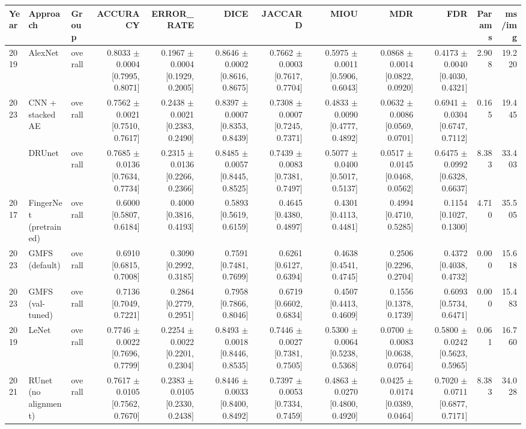 \begin{table}[t]
\centering
\small
\begin{tabular}{lllrrrrrrrrr}
\toprule
Year & Approach & Group & ACCURACY & ERROR_RATE & DICE & JACCARD & MIOU & MDR & FDR & Params & ms/img \\
\midrule
2019 & AlexNet & overall & 0.8033 $\pm$ 0.0004 [0.7995, 0.8071] & 0.1967 $\pm$ 0.0004 [0.1929, 0.2005] & 0.8646 $\pm$ 0.0002 [0.8616, 0.8675] & 0.7662 $\pm$ 0.0003 [0.7617, 0.7704] & 0.5975 $\pm$ 0.0011 [0.5906, 0.6043] & 0.0868 $\pm$ 0.0014 [0.0822, 0.0920] & 0.4173 $\pm$ 0.0040 [0.4030, 0.4321] & 2.908 & 19.220 \\
2023 & CNN + stacked AE & overall & 0.7562 $\pm$ 0.0021 [0.7510, 0.7617] & 0.2438 $\pm$ 0.0021 [0.2383, 0.2490] & 0.8397 $\pm$ 0.0007 [0.8353, 0.8439] & 0.7308 $\pm$ 0.0007 [0.7245, 0.7371] & 0.4833 $\pm$ 0.0090 [0.4777, 0.4892] & 0.0632 $\pm$ 0.0086 [0.0569, 0.0701] & 0.6941 $\pm$ 0.0304 [0.6747, 0.7112] & 0.165 & 19.445 \\
 & DRUnet & overall & 0.7685 $\pm$ 0.0136 [0.7634, 0.7734] & 0.2315 $\pm$ 0.0136 [0.2266, 0.2366] & 0.8485 $\pm$ 0.0057 [0.8445, 0.8525] & 0.7439 $\pm$ 0.0083 [0.7381, 0.7497] & 0.5077 $\pm$ 0.0400 [0.5017, 0.5137] & 0.0517 $\pm$ 0.0145 [0.0468, 0.0562] & 0.6475 $\pm$ 0.0992 [0.6328, 0.6637] & 8.383 & 33.403 \\
2017 & FingerNet (pretrained) & overall & 0.6000 [0.5807, 0.6184] & 0.4000 [0.3816, 0.4193] & 0.5893 [0.5619, 0.6159] & 0.4645 [0.4380, 0.4897] & 0.4301 [0.4113, 0.4481] & 0.4994 [0.4710, 0.5285] & 0.1154 [0.1027, 0.1300] & 4.710 & 35.505 \\
2023 & GMFS (default) & overall & 0.6910 [0.6815, 0.7008] & 0.3090 [0.2992, 0.3185] & 0.7591 [0.7481, 0.7699] & 0.6261 [0.6127, 0.6394] & 0.4638 [0.4541, 0.4745] & 0.2506 [0.2296, 0.2704] & 0.4372 [0.4038, 0.4732] & 0.000 & 15.618 \\
2023 & GMFS (val-tuned) & overall & 0.7136 [0.7049, 0.7221] & 0.2864 [0.2779, 0.2951] & 0.7958 [0.7866, 0.8046] & 0.6719 [0.6602, 0.6834] & 0.4507 [0.4413, 0.4609] & 0.1556 [0.1378, 0.1739] & 0.6093 [0.5734, 0.6471] & 0.000 & 15.483 \\
2019 & LeNet & overall & 0.7746 $\pm$ 0.0022 [0.7696, 0.7799] & 0.2254 $\pm$ 0.0022 [0.2201, 0.2304] & 0.8493 $\pm$ 0.0018 [0.8446, 0.8535] & 0.7446 $\pm$ 0.0027 [0.7381, 0.7505] & 0.5300 $\pm$ 0.0064 [0.5238, 0.5368] & 0.0700 $\pm$ 0.0083 [0.0638, 0.0764] & 0.5800 $\pm$ 0.0242 [0.5623, 0.5965] & 0.061 & 16.760 \\
2021 & RUnet (no alignment) & overall & 0.7617 $\pm$ 0.0105 [0.7562, 0.7670] & 0.2383 $\pm$ 0.0105 [0.2330, 0.2438] & 0.8446 $\pm$ 0.0033 [0.8400, 0.8492] & 0.7397 $\pm$ 0.0053 [0.7334, 0.7459] & 0.4863 $\pm$ 0.0270 [0.4800, 0.4920] & 0.0425 $\pm$ 0.0174 [0.0389, 0.0464] & 0.7020 $\pm$ 0.0711 [0.6877, 0.7171] & 8.383 & 34.028 \\

\end{tabular}
\end{table}
